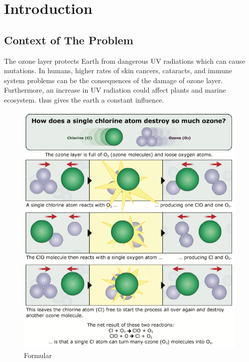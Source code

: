 \documentclass[12pt]{article}
\begin{document}
\newcommand{\vw}{\frac{v_i}{\omega_i}}

\section{Introduction}
\subsection{Context of The Problem}

The ozone layer protects Earth from dangerous UV radiations which can cause mutations. In humans, higher rates of skin cancers, cataracts, and immune system problems can be the consequences of the damage of ozone layer. Furthermore, an increase in UV radiation could affect plants and marine ecosystem. thus gives the earth a constant influence. \cite{kuntasal1987trends}

\begin{center}
\begin{figure}[htpb]
\centering
\includegraphics[scale=0.8]{Formular}
\caption{Formular}\label{fig:Formular}
\end{figure}
\end{center}
\end{document}
